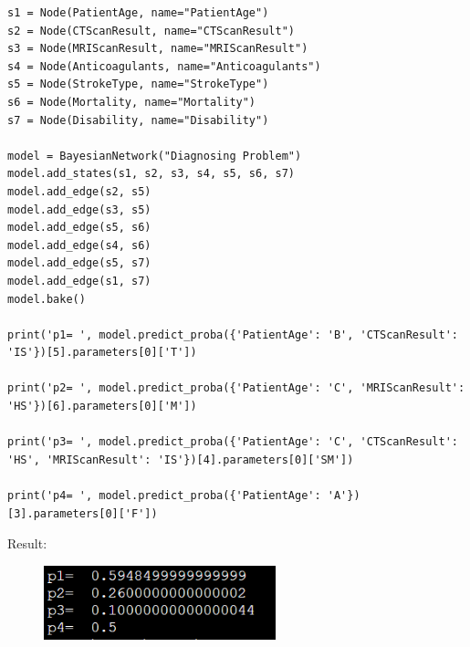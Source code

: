 \documentclass[a4paper, 11pt]{article}
\begin{document}
\begin{lstlisting}
s1 = Node(PatientAge, name="PatientAge")
s2 = Node(CTScanResult, name="CTScanResult")
s3 = Node(MRIScanResult, name="MRIScanResult")
s4 = Node(Anticoagulants, name="Anticoagulants")
s5 = Node(StrokeType, name="StrokeType")
s6 = Node(Mortality, name="Mortality")
s7 = Node(Disability, name="Disability")

model = BayesianNetwork("Diagnosing Problem")
model.add_states(s1, s2, s3, s4, s5, s6, s7)
model.add_edge(s2, s5)
model.add_edge(s3, s5)
model.add_edge(s5, s6)
model.add_edge(s4, s6)
model.add_edge(s5, s7)
model.add_edge(s1, s7)
model.bake()

print('p1= ', model.predict_proba({'PatientAge': 'B', 'CTScanResult': 'IS'})[5].parameters[0]['T'])

print('p2= ', model.predict_proba({'PatientAge': 'C', 'MRIScanResult': 'HS'})[6].parameters[0]['M'])

print('p3= ', model.predict_proba({'PatientAge': 'C', 'CTScanResult': 'HS', 'MRIScanResult': 'IS'})[4].parameters[0]['SM'])

print('p4= ', model.predict_proba({'PatientAge': 'A'})[3].parameters[0]['F'])
\end{lstlisting}
Result:
\begin{figure}[ht]
  \centering
  \includegraphics[width=0.6\textwidth]{Pic/2}
  \qquad
\end{figure}
%
%
\end{document}
